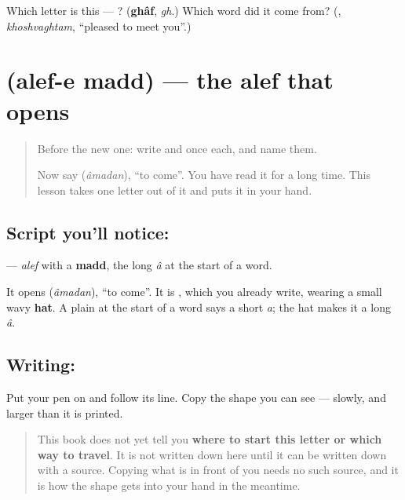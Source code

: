 \begin{tcolorbox}[breakable,colback=teal!4,colframe=teal!35!black,title={Before you move on}]
Which letter is this — ? (\textbf{ghâf}, \emph{gh}.) Which word did it come from? (\textbf{}, \emph{khoshvaghtam}, \textquotedblleft{}pleased to meet you\textquotedblright{}.)
\end{tcolorbox}
\section[\texorpdfstring{\fa{آ} (alef-e madd)}{آ (alef-e madd)}]{ (alef-e madd) — the alef that opens }

\label{lesson:FA-W26-alef-madd}



\begin{quote}
Before the new one: write  and  once each, and name them.

Now say \textbf{} (\emph{âmadan}), \textquotedblleft{}to come\textquotedblright{}. You have read it for a long time. This lesson takes one letter out of it and puts it in your hand.
\end{quote}

\subsection*{Script you'll notice: }
\textbf{} — \emph{alef} with a \textbf{madd}, the long \emph{â} at the start of a word.

It opens \textbf{} (\emph{âmadan}), \textquotedblleft{}to come\textquotedblright{}. It is \textbf{}, which you already write, wearing a small wavy \textbf{hat}. A plain \textbf{} at the start of a word says a short \emph{a}; the hat makes it a long \emph{â}.

\subsection*{Writing: }
Put your pen on  and follow its line. Copy the shape you can see — slowly, and larger than it is printed.

\begin{quote}
This book does not yet tell you \textbf{where to start this letter or which way to travel}. It is not written down here until it can be written down with a source. Copying what is in front of you needs no such source, and it is how the shape gets into your hand in the meantime.
\end{quote}


